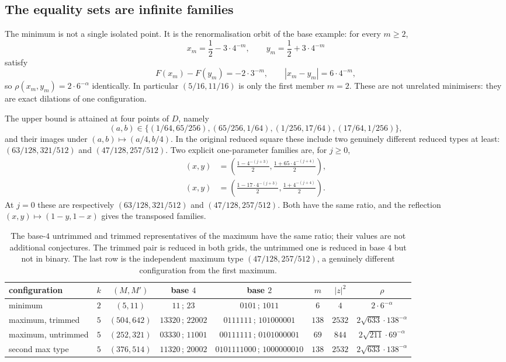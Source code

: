 \documentclass[11pt]{article}
\theoremstyle{remark}
\begin{document}
\subsection{The equality sets are infinite families}
The minimum is not a single isolated point. It is the renormalisation orbit of the base example:
for every $m\ge2$,
\[
  x_m=\frac12-3\cdot4^{-m},\qquad y_m=\frac12+3\cdot4^{-m}
\]
satisfy
\[
  F(x_m)-F(y_m)=-2\cdot3^{-m},\qquad |x_m-y_m|=6\cdot4^{-m},
\]
so $\rho(x_m,y_m)=2\cdot6^{-\alpha}$ identically. In particular $(5/16,11/16)$ is only the first
member $m=2$. These are not unrelated minimisers: they are exact dilations of one configuration.

The upper bound is attained at four points of $D$, namely
\[
  (a,b)\in\{(1/64,65/256),(65/256,1/64),(1/256,17/64),(17/64,1/256)\},
\]
and their images under $(a,b)\mapsto(a/4,b/4)$. In the original reduced square these include two
genuinely different reduced types at least: $(63/128,321/512)$ and $(47/128,257/512)$. Two explicit
one-parameter families are, for $j\ge0$,
\begin{align*}
  (x,y)&=\left(\frac{1-4^{-(j+3)}}2,\frac{1+65\cdot4^{-(j+4)}}2\right),\\
  (x,y)&=\left(\frac{1-17\cdot4^{-(j+3)}}2,\frac{1+4^{-(j+4)}}2\right).
\end{align*}
At $j=0$ these are respectively $(63/128,321/512)$ and $(47/128,257/512)$. Both have the same ratio,
and the reflection $(x,y)\mapsto(1-y,1-x)$ gives the transposed families.

\begin{table}[h!]
\centering
\footnotesize
\setlength{\tabcolsep}{4pt}
\begin{tabular}{lccccccc}
\toprule
configuration & $k$ & $(M,M')$ & base $4$ & base $2$ & $m$ & $|z|^2$ & $\rho$\\
\midrule
minimum & $2$ & $(5,11)$ & $11\,;\,23$ & $0101\,;\,1011$ & $6$ & $4$ & $2\cdot6^{-\alpha}$\\
maximum, trimmed & $5$ & $(504,642)$ & $13320\,;\,22002$ & $0111111\,;\,101000001$ & $138$ & $2532$ & $2\sqrt{633}\cdot138^{-\alpha}$\\
maximum, untrimmed & $5$ & $(252,321)$ & $03330\,;\,11001$ & $00111111\,;\,0101000001$ & $69$ & $844$ & $2\sqrt{211}\cdot69^{-\alpha}$\\
second max type & $5$ & $(376,514)$ & $11320\,;\,20002$ & $0101111000\,;\,1000000010$ & $138$ & $2532$ & $2\sqrt{633}\cdot138^{-\alpha}$\\
\bottomrule
\end{tabular}
\caption{The base-$4$ untrimmed and trimmed representatives of the maximum have the same ratio;
their values are not additional conjectures. The trimmed pair is reduced in both grids, the
untrimmed one is reduced in base $4$ but not in binary. The last row is the independent maximum type
$(47/128,257/512)$, a genuinely different configuration from the first maximum.}
\end{table}
\end{document}

